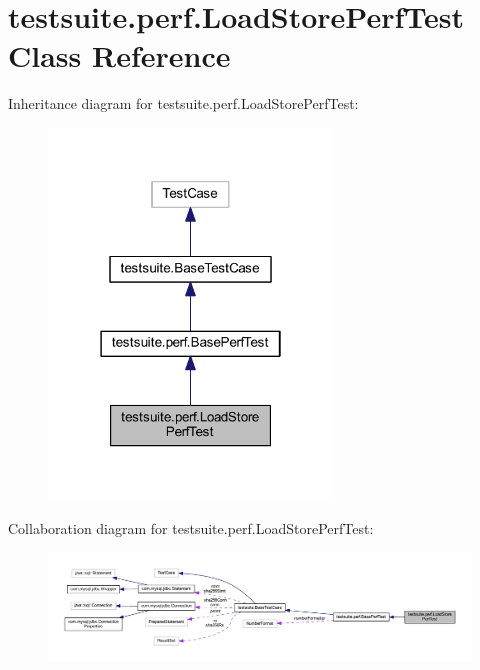 \hypertarget{classtestsuite_1_1perf_1_1_load_store_perf_test}{}\section{testsuite.\+perf.\+Load\+Store\+Perf\+Test Class Reference}
\label{classtestsuite_1_1perf_1_1_load_store_perf_test}


Inheritance diagram for testsuite.\+perf.\+Load\+Store\+Perf\+Test\+:
\nopagebreak
\begin{figure}[H]
\begin{center}
\leavevmode
\includegraphics[width=214pt]{classtestsuite_1_1perf_1_1_load_store_perf_test__inherit__graph}
\end{center}
\end{figure}


Collaboration diagram for testsuite.\+perf.\+Load\+Store\+Perf\+Test\+:
\nopagebreak
\begin{figure}[H]
\begin{center}
\leavevmode
\includegraphics[width=350pt]{classtestsuite_1_1perf_1_1_load_store_perf_test__coll__graph}
\end{center}
\end{figure}
